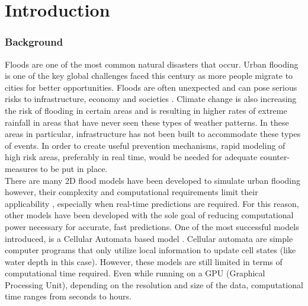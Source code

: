 
\chapter{Introduction} %
\label{Chapter1} %

\subsection{Background}


Floods are one of the most common natural disasters that occur. Urban flooding is one of the key global challenges faced this century \cite{o2020drivers} as more people migrate to cities for better opportunities. Floods are often unexpected and can pose serious risks to infrastructure, economy and societies \cite{russo2023evaluation}. Climate change is also increasing the risk of flooding in certain areas and is resulting in higher rates of extreme rainfall in areas that have never seen these types of weather patterns. In these areas in particular, infrastructure has not been built to accommodate these types of events. In order to create useful prevention mechanisms, rapid modeling of high risk areas, preferably in real time,  would be needed for adequate counter-measures to be put in place. \\

There are many 2D flood models have been developed to simulate urban flooding however, their complexity and computational requirements limit their applicability \cite{Ghimire}, especially when real-time predictions are required. For this reason, other models have been developed with the sole goal of reducing computational power necessary for accurate, fast predictions. One of the most successful models introduced, is a Cellular Automata based model \cite{guidolin2016weighted}. Cellular automata are simple computer programs that only utilize local information to update cell states (like water depth in this case). However, these models are still limited in terms of computational time required. Even while running on a GPU (Graphical Processing Unit), depending on the resolution and size of the data, computational time ranges from seconds to hours. \\

